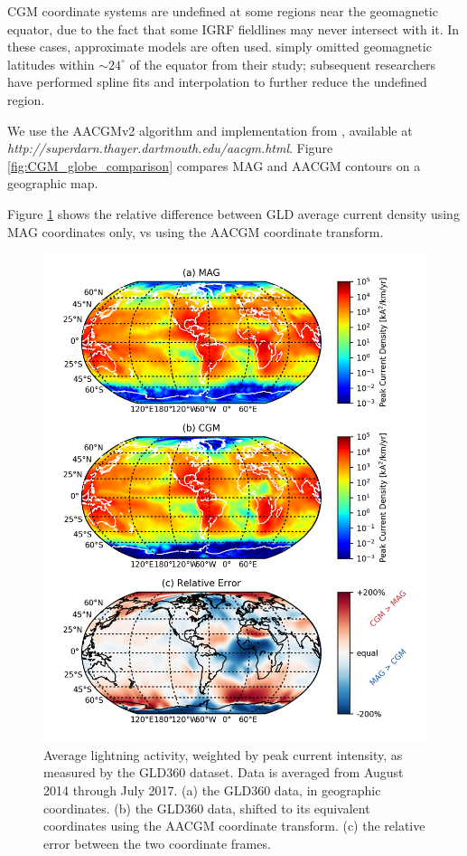 CGM coordinate systems are undefined at some regions near the geomagnetic equator, due to the fact that some IGRF fieldlines may never intersect with it. In these cases, approximate models are often used. \cite{Baker1989} simply omitted geomagnetic latitudes within $\sim 24^\circ$ of the equator from their study; subsequent researchers have performed spline fits and interpolation to further reduce the undefined region.

We use the AACGMv2 algorithm and implementation from \cite{Shepherd2014}, available at \emph{http://superdarn.thayer.dartmouth.edu/aacgm.html}. Figure \ref{fig:CGM_globe_comparison} compares MAG and AACGM contours on a geographic map.

Figure \ref{fig:CGM_vs_MAG_GLD} shows the relative difference between GLD average current density using MAG coordinates only, vs using the AACGM coordinate transform.



\begin{figure}[]
\begin{center}
\includegraphics{figures/GLD_CGM_vs_MAG_comparison.png}
\caption[GLD average peak current density, adjusted using AACGM coordinates]{Average lightning activity, weighted by peak current intensity, as measured by the GLD360 dataset. Data is averaged from August 2014 through July 2017. (a) the GLD360 data, in geographic coordinates. (b) the GLD360 data, shifted to its equivalent coordinates using the AACGM coordinate transform. (c) the relative error between the two coordinate frames.}
\label{fig:CGM_vs_MAG_GLD}
\end{center}
\end{figure}


